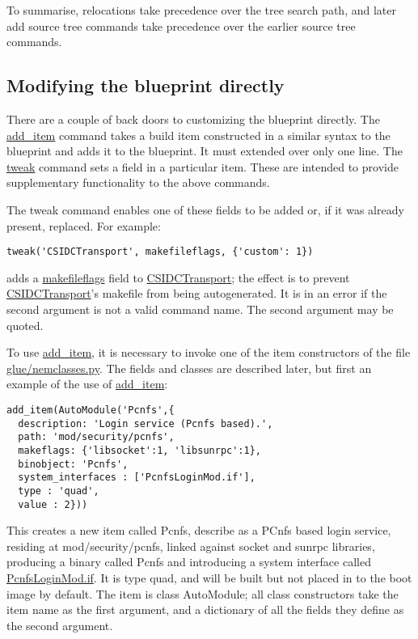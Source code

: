 \documentclass[a4paper]{article}
\begin{document}
To summarise, 
relocations take precedence over the tree search path, and later add
source tree commands take precedence over the earlier source tree commands.

\subsection{Modifying the blueprint directly}

There are a couple of back doors to customizing the blueprint
directly. The \url{add_item} command takes a build item constructed in
a similar syntax to the blueprint and adds it to the blueprint. It
must extended over only one line. The \url{tweak} command sets a field
in a particular item. These are intended to provide supplementary
functionality to the above commands.

The tweak command enables one of these fields to be added or, if it
was already present, replaced. For example:

\begin{verbatim}
tweak('CSIDCTransport', makefileflags, {'custom': 1})
\end{verbatim}

adds a \url{makefileflags} field to \url{CSIDCTransport}; the effect
is to prevent \url{CSIDCTransport}'s makefile from being
autogenerated. It is in an error if the second argument is not a valid
command name. The second argument may be quoted.


To use \url{add_item}, it is necessary to invoke one of the
item constructors of the file \url{glue/nemclasses.py}.
The fields and classes are described later, but first an example of
the use of \url{add_item}:

\begin{small}
\begin{verbatim}
add_item(AutoModule('Pcnfs',{
  description: 'Login service (Pcnfs based).',
  path: 'mod/security/pcnfs',
  makeflags: {'libsocket':1, 'libsunrpc':1},
  binobject: 'Pcnfs',
  system_interfaces : ['PcnfsLoginMod.if'],
  type : 'quad',
  value : 2}))
\end{verbatim}
\end{small}

This creates a new item called Pcnfs, describe as a PCnfs based login
service, residing at mod/security/pcnfs, linked against socket and
sunrpc libraries, producing a binary called Pcnfs and introducing a
system interface called \url{PcnfsLoginMod.if}. It is type quad, and
will be built but not placed in to the boot image by default. The item
is class AutoModule; all class constructors take the item name as the
first argument, and a dictionary of all the fields they define as the
second argument. 
\end{document}
